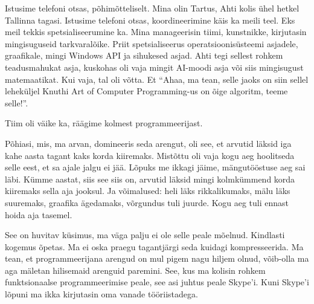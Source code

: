 Istusime telefoni otsas, põhimõtteliselt. Mina olin Tartus, Ahti kolis ühel hetkel Tallinna  tagasi. Istusime telefoni otsas, koordineerimine käis ka meili teel. Eks meil tekkis spetsialiseerumine ka. Mina manageerisin tiimi, kunstnikke, kirjutasin mingisuguseid tarkvaralõike. Priit spetsialiseerus operatsioonisüsteemi asjadele, graafikale, mingi Windows API ja sihukesed asjad. Ahti tegi sellest rohkem teadusmahukat asja, kuskohas oli vaja mingit AI-moodi asja või siis mingisugust matemaatikat.  Kui vaja, tal oli võtta. Et \enquote{Ahaa, ma tean, selle jaoks on siin sellel leheküljel Knuthi Art of Computer Programming-us on õige algoritm, teeme selle!}. 


Tiim oli väike ka, räägime kolmest programmeerijast. 


Põhiasi, mis, ma arvan, domineeris seda arengut, oli see, et arvutid läksid iga kahe aasta tagant kaks korda kiiremaks. Mistõttu oli vaja kogu aeg hoolitseda selle eest, et sa ajale jalgu ei jää. Lõpuks me ikkagi jäime, mängutööstuse aeg sai läbi. Kümme aastat, siis see siis on, arvutid läksid mingi kolmkümmend korda kiiremaks sella aja jooksul. Ja  võimalused: heli läks rikkalikumaks,  mälu läks suuremaks, graafika ägedamaks, võrgundus tuli juurde. Kogu aeg tuli ennast hoida aja tasemel. 


See on huvitav küsimus, ma  väga palju ei ole selle peale mõelnud. Kindlasti  kogemus õpetas. Ma ei oska praegu  tagantjärgi seda kuidagi kompresseerida. Ma tean, et programmeerijana arengud on mul pigem nagu hiljem olnud, võib-olla ma aga mäletan hilisemaid arenguid paremini. See, kus ma kolisin rohkem funktsionaalse programmeerimise peale, see asi juhtus peale Skype'i. Kuni Skype'i lõpuni ma ikka kirjutasin oma vanade tööriistadega.

